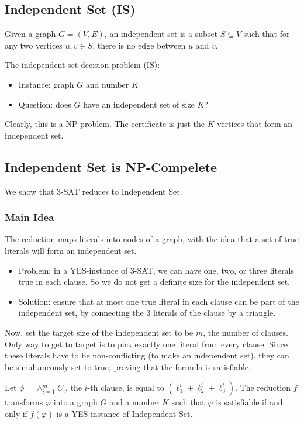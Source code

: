 \subsection{Independent Set (IS)}
Given a graph $G= (V, E)$, an independent set is a subset $S \subseteq V$ such that for any two vertices $u, v \in S$, there is no edge between $u$ and $v$.

The independent set decision problem (IS):
\begin{itemize}
	\item Instance: graph $G$ and number $K$
	\item Question: does $G$ have an independent set of size $K$?
\end{itemize}

Clearly, this is a NP problem. The certificate is just the $K$ vertices that form an independent set.

\subsection{Independent Set is NP-Compelete}

We show that 3-SAT reduces to Independent Set. 

\subsubsection{Main Idea}
The reduction maps literals into nodes of a graph, with the idea that a set of true literals will form an independent set.

\begin{itemize}
	\item Problem: in a YES-instance of 3-SAT, we can have one, two, or three literals true in each clause. So we do not get a definite size for the independent set.
	\item Solution: ensure that at most  one true literal in each clause can be part of the independent set, by connecting the 3 literals of the clause by a triangle.
\end{itemize}

Now, set the target size of the independent set to be $m$, the number of clauses. Only way to get to target is to pick exactly one literal from every clause. Since these literals have to be non-conflicting (to make an independent set), they can be simultaneously set to true, proving that the formula is satisfiable.

Let $\phi = \wedge_{i=1}^m C_i$, the $i$-th clause, is equal to $(\ell_1^i + \ell_2^i + \ell_3^i)$. The reduction $f$ transforms $\varphi$ into a graph $G$ and a number $K$ such that $\varphi$ is satisfiable if and only if $f(\varphi)$ is a YES-instance of Independent Set.

